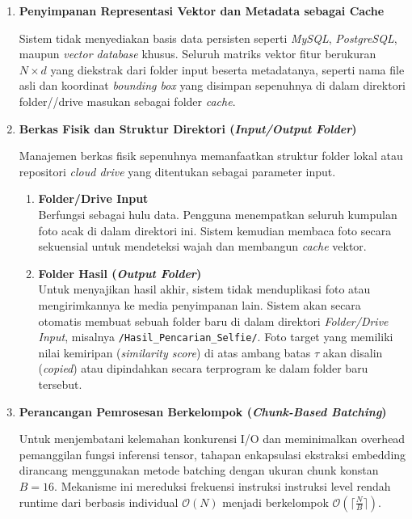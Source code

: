 \begin{enumerate}
    \item \textbf{Penyimpanan Representasi Vektor dan Metadata sebagai Cache}

    Sistem tidak menyediakan basis data persisten seperti \textit{MySQL}, \textit{PostgreSQL}, maupun \textit{vector database} khusus. Seluruh matriks vektor fitur berukuran $N \times d$ yang diekstrak dari folder input beserta metadatanya, seperti nama file asli dan koordinat \textit{bounding box} yang disimpan sepenuhnya di dalam direktori folder//drive masukan sebagai folder \textit{cache}.

    \item \textbf{Berkas Fisik dan Struktur Direktori (\textit{Input/Output Folder})}

    Manajemen berkas fisik sepenuhnya memanfaatkan struktur folder lokal atau repositori \textit{cloud drive} yang ditentukan sebagai parameter input.

    \begin{enumerate}
        \item \textbf{Folder/Drive Input} \\
        Berfungsi sebagai hulu data. Pengguna menempatkan seluruh kumpulan foto acak di dalam direktori ini. Sistem kemudian membaca foto secara sekuensial untuk mendeteksi wajah dan membangun \textit{cache} vektor.

        \item \textbf{Folder Hasil (\textit{Output Folder})} \\
        Untuk menyajikan hasil akhir, sistem tidak menduplikasi foto atau mengirimkannya ke media penyimpanan lain. Sistem akan secara otomatis membuat sebuah folder baru di dalam direktori \textit{Folder/Drive Input}, misalnya \texttt{/Hasil\_Pencarian\_Selfie/}. Foto target yang memiliki nilai kemiripan (\textit{similarity score}) di atas ambang batas $\tau$ akan disalin (\textit{copied}) atau dipindahkan secara terprogram ke dalam folder baru tersebut.
    \end{enumerate}

    \item \textbf{Perancangan Pemrosesan Berkelompok (\textit{Chunk-Based Batching})}
    
    Untuk menjembatani kelemahan konkurensi I/O dan meminimalkan overhead pemanggilan fungsi inferensi tensor, tahapan enkapsulasi ekstraksi embedding dirancang menggunakan metode batching dengan ukuran chunk konstan $B = 16$. Mekanisme ini mereduksi frekuensi instruksi instruksi level rendah runtime dari berbasis individual $\mathcal{O}(N)$ menjadi berkelompok $\mathcal{O}(\lceil \frac{N}{B} \rceil)$.

\end{enumerate}

